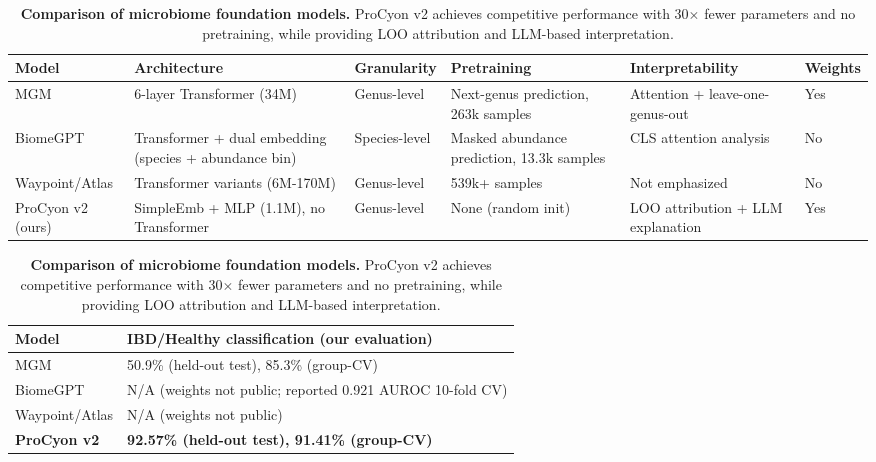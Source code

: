 \begin{table}[t]
\centering
\caption{\textbf{Comparison of microbiome foundation models.}
ProCyon v2 achieves competitive performance with 30$\times$ fewer parameters
and no pretraining, while providing LOO attribution and LLM-based interpretation.}
\label{tab:fm_comparison}
\begin{tabular}{p{2.5cm}p{2.5cm}p{2.2cm}p{2.2cm}p{3cm}p{1.5cm}}
\toprule
\textbf{Model} & \textbf{Architecture} & \textbf{Granularity} & \textbf{Pretraining} & \textbf{Interpretability} & \textbf{Weights} \\
\midrule
  MGM & 6-layer Transformer (34M) & Genus-level & Next-genus prediction, 263k samples & Attention + leave-one-genus-out & Yes \\
  BiomeGPT & Transformer + dual embedding (species + abundance bin) & Species-level & Masked abundance prediction, 13.3k samples & CLS attention analysis & No \\
  Waypoint/Atlas & Transformer variants (6M-170M) & Genus-level & 539k+ samples & Not emphasized & No \\
  ProCyon v2 (ours) & SimpleEmb + MLP (1.1M), no Transformer & Genus-level & None (random init) & LOO attribution + LLM explanation & Yes \\
\bottomrule
\end{tabular}
\vspace{4pt}
\begin{tabular}{ll}
\toprule
\textbf{Model} & \textbf{IBD/Healthy classification (our evaluation)} \\
\midrule
  MGM & 50.9\% (held-out test), 85.3\% (group-CV) \\
  BiomeGPT & N/A (weights not public; reported 0.921 AUROC 10-fold CV) \\
  Waypoint/Atlas & N/A (weights not public) \\
  \textbf{ProCyon v2} & \textbf{92.57\% (held-out test), 91.41\% (group-CV)} \\
\bottomrule
\end{tabular}
\end{table}